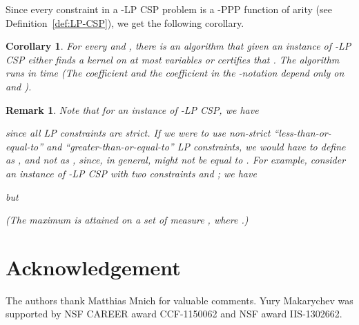 \documentclass[11pt]{article}
\newtheorem{corollary}[theorem]{Corollary}
\newtheorem{remark}[theorem]{Remark}
\begin{document}
\smallskip
Since every constraint in a  -LP CSP problem is a -PPP function of arity  (see Definition~\ref{def:LP-CSP}), we get the following corollary.
\begin{corollary}
For every  and , there is an algorithm that given an instance of -LP CSP
either finds a kernel on at most  variables
or certifies that .
The algorithm runs in time  (The coefficient  and the coefficient in the -notation depend only on  and ).
\end{corollary}
\begin{remark}
Note that for an instance of -LP CSP, we have

since all LP constraints are strict. If we were to use non-strict ``less-than-or-equal-to'' and ``greater-than-or-equal-to'' LP constraints, we would
have to define
 as  , and not as ,
since, in general,  might not be equal to .
For example, consider an instance of -LP CSP with two constraints  and ; we have

but

(The maximum is attained on a set of measure , where .)
\end{remark}
 
\section*{Acknowledgement}
The authors thank Matthias Mnich for valuable comments. Yury Makarychev was supported by NSF CAREER award CCF-1150062 and NSF award IIS-1302662.
\end{document}
